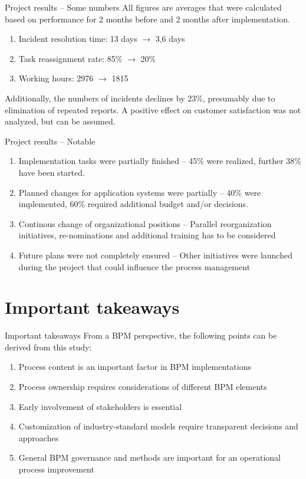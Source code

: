 \documentclass{beamer}
\begin{document}
\begin{frame}{Project results -- Some numbers}
    All figures are averages that were calculated based on performance for 2 months before and 2 months after implementation.
    \begin{enumerate}[$\circ$]
        \item Incident resolution time: 13 days $\rightarrow$ 3,6 days
        \item Task reassignment rate: 85\% $\rightarrow$ 20\%
        \item Working hours: 2976 $\rightarrow$  1815
    \end{enumerate}
    Additionally, the numbers of incidents declines by 23\%, presumably due to elimination of repeated reports.
    A positive effect on customer satisfaction was not analyzed, but can be assumed.
\end{frame}

\begin{frame}{Project results -- Notable}
    \begin{enumerate}[$\circ$]
        \item Implementation tasks were partially finished -- 45\% were realized, further 38\% have been started.
        \item Planned changes for application systems were partially -- 40\% were implemented, 60\% required additional budget and/or decisions.
        \item Continous change of organizational positions -- Parallel reorganization initiatives, re-nominations and additional training has to be considered
        \item Future plans were not completely ensured -- Other initiatives were launched during the project that could influence the process management
    \end{enumerate}
\end{frame}

\section{Important takeaways}
\begin{frame}{Important takeaways}
    From a BPM perspective, the following points can be derived from this study:
    \begin{enumerate}[$\circ$]
        \item Process content is an important factor in BPM implementations
        \item Process ownership requires considerations of different BPM elements
        \item Early involvement of stakeholders is essential
        \item Customization of industry-standard models require transparent decisions and approaches
        \item General BPM governance and methods are important for an operational process improvement
    \end{enumerate}
\end{frame}
\end{document}
